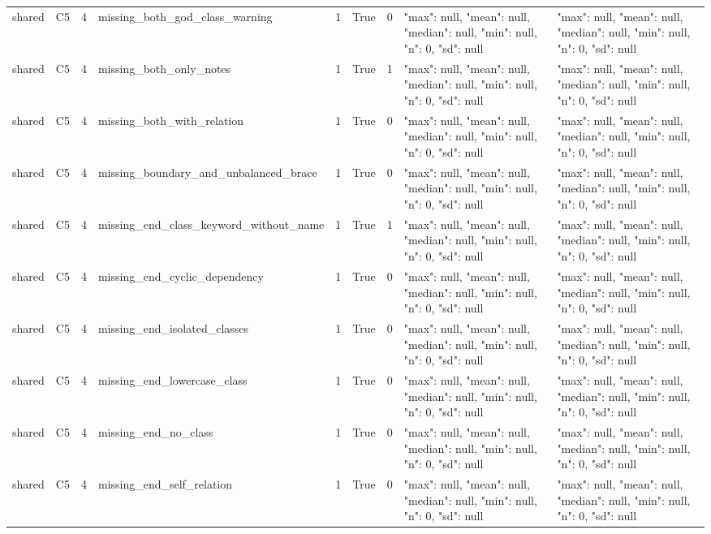 \begin{tabular}{lllllllll}
shared & C5 & 4 & missing\_both\_god\_class\_warning & 1 & True & 0 & {"max": null, "mean": null, "median": null, "min": null, "n": 0, "sd": null} & {"max": null, "mean": null, "median": null, "min": null, "n": 0, "sd": null} \\
shared & C5 & 4 & missing\_both\_only\_notes & 1 & True & 1 & {"max": null, "mean": null, "median": null, "min": null, "n": 0, "sd": null} & {"max": null, "mean": null, "median": null, "min": null, "n": 0, "sd": null} \\
shared & C5 & 4 & missing\_both\_with\_relation & 1 & True & 0 & {"max": null, "mean": null, "median": null, "min": null, "n": 0, "sd": null} & {"max": null, "mean": null, "median": null, "min": null, "n": 0, "sd": null} \\
shared & C5 & 4 & missing\_boundary\_and\_unbalanced\_brace & 1 & True & 0 & {"max": null, "mean": null, "median": null, "min": null, "n": 0, "sd": null} & {"max": null, "mean": null, "median": null, "min": null, "n": 0, "sd": null} \\
shared & C5 & 4 & missing\_end\_class\_keyword\_without\_name & 1 & True & 1 & {"max": null, "mean": null, "median": null, "min": null, "n": 0, "sd": null} & {"max": null, "mean": null, "median": null, "min": null, "n": 0, "sd": null} \\
shared & C5 & 4 & missing\_end\_cyclic\_dependency & 1 & True & 0 & {"max": null, "mean": null, "median": null, "min": null, "n": 0, "sd": null} & {"max": null, "mean": null, "median": null, "min": null, "n": 0, "sd": null} \\
shared & C5 & 4 & missing\_end\_isolated\_classes & 1 & True & 0 & {"max": null, "mean": null, "median": null, "min": null, "n": 0, "sd": null} & {"max": null, "mean": null, "median": null, "min": null, "n": 0, "sd": null} \\
shared & C5 & 4 & missing\_end\_lowercase\_class & 1 & True & 0 & {"max": null, "mean": null, "median": null, "min": null, "n": 0, "sd": null} & {"max": null, "mean": null, "median": null, "min": null, "n": 0, "sd": null} \\
shared & C5 & 4 & missing\_end\_no\_class & 1 & True & 0 & {"max": null, "mean": null, "median": null, "min": null, "n": 0, "sd": null} & {"max": null, "mean": null, "median": null, "min": null, "n": 0, "sd": null} \\
shared & C5 & 4 & missing\_end\_self\_relation & 1 & True & 0 & {"max": null, "mean": null, "median": null, "min": null, "n": 0, "sd": null} & {"max": null, "mean": null, "median": null, "min": null, "n": 0, "sd": null} \\

\end{tabular}
